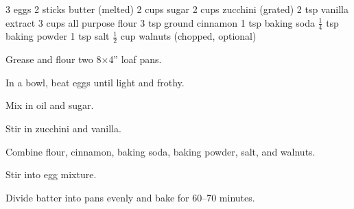 \dishtype{\bread}
\dishother{\vegetarian}
\begin{ingreds}
    3 eggs
    2 sticks butter (melted)
    2 cups sugar
    2 cups zucchini (grated)
    2 tsp vanilla extract
    3 cups all purpose flour
    3 tsp ground cinnamon
    1 tsp baking soda
    $\frac{1}{4}$ tsp baking powder
    1 tsp salt
    $\frac{1}{2}$ cup walnuts (chopped, optional)
\end{ingreds}
\begin{method}
    Grease and flour two 8$\times$4'' loaf pans.\par
    In a bowl, beat eggs until light and frothy.\par
    Mix in oil and sugar.\par
    Stir in zucchini and vanilla.\par
    Combine flour, cinnamon, baking soda, baking powder, salt, and walnuts.\par
    Stir into egg mixture.\par
    Divide batter into pans evenly and bake for 60--70 minutes.
\end{method}
